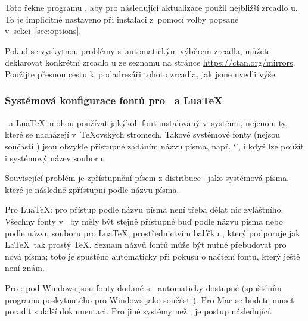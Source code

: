 \documentclass[\classoptions,slovak,english,czech]{\classname}
\begin{document}
Toto řekne programu , aby pro následující
aktualizace použil nejbližší zrcadlo \CTAN{}u.
To je implicitně nastaveno při instalaci
z~\DVD pomocí volby popsané v~sekci~\ref{sec:options}. 

Pokud se vyskytnou problémy s~automatickým výběrem zrcadla, 
můžete deklarovat konkrétní zrcadlo \CTAN{}u ze seznamu na stránce
\url{https://ctan.org/mirrors}. Použijte přesnou cestu k~podadresáři 
 tohoto zrcadla, jak jsme uvedli výše.

\subsubsection{Systémová konfigurace fontů pro \protect\XeTeX\protect\ a Lua\protect\TeX}
\label{sec:font-conf-sys}

\XeTeX\ a Lua\TeX\ mohou používat jakýkoli font instalovaný 
v~systému, nejenom ty, které se nacházejí v~\TeX{}ovských stromech. 
Takové systémové fonty (nejsou součástí \TL) jsou obvykle přístupné zadáním názvu písma, např. `', 
i když lze použít i systémový název souboru. 

Související problém je zpřístupnění písem z distribuce \TL\
jako systémová písma, které je následně zpřístupní podle názvu písma.

Pro Lua\TeX: pro přístup podle názvu písma není třeba dělat nic zvláštního. Všechny
fonty v \TL\ by měly být stejně přístupné buď podle názvu písma nebo
podle názvu souboru pro Lua\TeX, prostřednictvím balíčku , který
podporuje jak \LaTeX\, tak prostý \TeX. Seznam názvů fontů \pkgname{luaotfload} může být nutné přebudovat pro nová písma; toto je spuštěno
automaticky při pokusu o načtení fontu, který ještě není znám.

Pro \XeTeX: pod Windows jsou fonty dodané s~\TL\ automaticky
dostupné (spuštěním programu  poskytnutého pro Windows jako součást \TL).
Pro Mac se budete muset poradit s další dokumentaci. Pro jiné systémy než \macOS, je postup následující.
\end{document}

